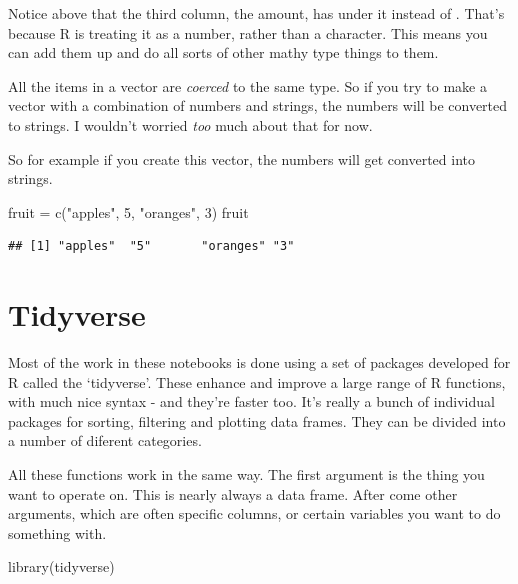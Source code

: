 \documentclass[
]{book}
\newenvironment{Shaded}{\begin{snugshade}}{\end{snugshade}}
\newcommand{\DecValTok}[1]{\textcolor[rgb]{0.00,0.00,0.81}{#1}}
\newcommand{\FunctionTok}[1]{\textcolor[rgb]{0.00,0.00,0.00}{#1}}
\newcommand{\NormalTok}[1]{#1}
\newcommand{\OtherTok}[1]{\textcolor[rgb]{0.56,0.35,0.01}{#1}}
\newcommand{\StringTok}[1]{\textcolor[rgb]{0.31,0.60,0.02}{#1}}
\begin{document}
Notice above that the third column, the amount, has under it instead of . That's because R is treating it as a number, rather than a character. This means you can add them up and do all sorts of other mathy type things to them.

All the items in a vector are \emph{coerced} to the same type. So if you try to make a vector with a combination of numbers and strings, the numbers will be converted to strings. I wouldn't worried \emph{too} much about that for now.

So for example if you create this vector, the numbers will get converted into strings.

\begin{Shaded}
\begin{Highlighting}[]
\NormalTok{fruit }\OtherTok{=} \FunctionTok{c}\NormalTok{(}\StringTok{"apples"}\NormalTok{, }\DecValTok{5}\NormalTok{, }\StringTok{"oranges"}\NormalTok{, }\DecValTok{3}\NormalTok{)}
\NormalTok{fruit}
\end{Highlighting}
\end{Shaded}

\begin{verbatim}
## [1] "apples"  "5"       "oranges" "3"
\end{verbatim}

\hypertarget{tidyverse}{%
\section{Tidyverse}\label{tidyverse}}

Most of the work in these notebooks is done using a set of packages developed for R called the `tidyverse'. These enhance and improve a large range of R functions, with much nice syntax - and they're faster too. It's really a bunch of individual packages for sorting, filtering and plotting data frames. They can be divided into a number of diferent categories.

All these functions work in the same way. The first argument is the thing you want to operate on. This is nearly always a data frame. After come other arguments, which are often specific columns, or certain variables you want to do something with.

\begin{Shaded}
\begin{Highlighting}[]
\FunctionTok{library}\NormalTok{(tidyverse)}
\end{Highlighting}
\end{Shaded}
\end{document}
